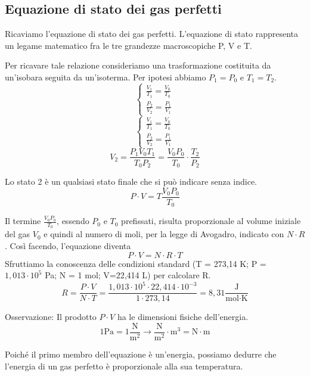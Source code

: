 \subsection{Equazione di stato dei gas perfetti}
    \par Ricaviamo l'equazione di stato dei gas perfetti. L'equazione di stato rappresenta un legame matematico fra le tre grandezze macroscopiche P, V e T.
    \par Per ricavare tale relazione consideriamo una trasformazione costituita da un'isobara seguita da un'isoterma.
    Per ipotesi abbiamo $P_1=P_0$ e $T_1=T_2$.
    \begin{equation*}
        \begin{cases}
            \frac{V_1}{T_1}=\frac{V_0}{T_0} \\
            \frac{P_2}{V_2}=\frac{P_1}{V_1}
        \end{cases}
    \end{equation*}\begin{equation*}
        \begin{cases}
            \frac{V_1}{T_1}=\frac{V_0}{T_0} \\
            \frac{P_2}{V_2}=\frac{P_1}{V_1}
        \end{cases}
    \end{equation*}\begin{equation*}
        V_2=\frac{P_1V_0T_1}{T_0P_2}=\frac{V_0P_0}{T_0}\cdot\frac{T_2}{P_2}
    \end{equation*}
    \par Lo stato 2 è un qualsiasi stato finale che si può indicare senza indice.
    \begin{equation*}
        P\cdot V=T\frac{V_0P_0}{T_0}
    \end{equation*}
    \par Il termine $\frac{V_0P_0}{T_0}$, essendo $P_0$ e $T_0$ prefissati, risulta proporzionale al volume iniziale del gas $V_0$ e quindi al numero di moli, per la legge di Avogadro, indicato con $N\cdot R$. Così facendo, l'equazione diventa
    \begin{equation}
        P \cdot V=N \cdot R \cdot T
    \end{equation}
    Sfruttiamo la conoscenza delle condizioni standard (T = 273,14 K; P = $1,013\cdot10^5$ Pa; N = 1 mol; V=22,414 L) per calcolare R.
    \begin{equation}
        R=\frac{P\cdot V}{N\cdot T}=\frac{1,013\cdot10^5\cdot22,414\cdot10^{-3}}{1\cdot 273,14}=8,31\frac{\textrm{J}}{\textrm{mol}\cdot \textrm{K}}   
    \end{equation}
    \par Osservazione: Il prodotto $P\cdot V$ ha le dimensioni fisiche dell'energia.
    \begin{equation*}
        1 \textrm{Pa}=1\frac{\textrm{N}}{\textrm{m}^2} \rightarrow \frac{\textrm{N}}{\textrm{m}^2}\cdot \textrm{m}^3=\textrm{N}\cdot\textrm{m}
    \end{equation*}
    \par Poiché il primo membro dell'equazione è un'energia, possiamo dedurre che l'energia di un gas perfetto è proporzionale alla sua temperatura.
